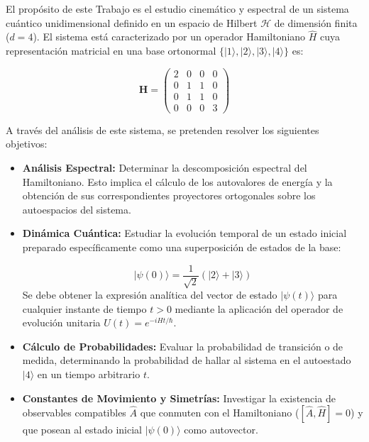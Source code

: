 \documentclass[11pt,a4paper,spanish]{book}
\begin{document}
El propósito de este Trabajo es el estudio cinemático y espectral de un sistema cuántico unidimensional definido en un espacio de Hilbert $\mathcal{H}$ de dimensión finita ($d=4$). El sistema está caracterizado por un operador Hamiltoniano $\hat{H}$ cuya representación matricial en una base ortonormal $\{|1\rangle, |2\rangle, |3\rangle, |4\rangle\}$ es:

\begin{equation}
\mathbf{H} = \begin{pmatrix} 
2 & 0 & 0 & 0 \\ 
0 & 1 & 1 & 0 \\ 
0 & 1 & 1 & 0 \\ 
0 & 0 & 0 & 3 
\end{pmatrix}
\end{equation}

A través del análisis de este sistema, se pretenden resolver los siguientes objetivos:

\begin{itemize}
    \item \textbf{Análisis Espectral:} Determinar la descomposición espectral del Hamiltoniano. Esto implica el cálculo de los autovalores de energía y la obtención de sus correspondientes proyectores ortogonales sobre los autoespacios del sistema.

    \item \textbf{Dinámica Cuántica:} Estudiar la evolución temporal de un estado inicial preparado específicamente como una superposición de estados de la base:

    \begin{equation}
    |\psi(0)\rangle = \frac{1}{\sqrt{2}} (|2\rangle + |3\rangle)
    \end{equation}
    Se debe obtener la expresión analítica del vector de estado $|\psi(t)\rangle$ para cualquier instante de tiempo $t > 0$ mediante la aplicación del operador de evolución unitaria $U(t) = e^{-iHt/\hbar}$.
    \item \textbf{Cálculo de Probabilidades:} Evaluar la probabilidad de transición o de medida, determinando la probabilidad de hallar al sistema en el autoestado $|4\rangle$ en un tiempo arbitrario $t$.

    \item \textbf{Constantes de Movimiento y Simetrías:} Investigar la existencia de observables compatibles $\hat{A}$ que conmuten con el Hamiltoniano ($[\hat{A}, \hat{H}] = 0$) y que posean al estado inicial $|\psi(0)\rangle$ como autovector.

\end{itemize}
\end{document}
